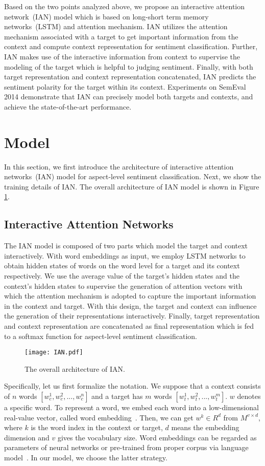 \documentclass{article}
\begin{document}
Based on the two points analyzed above,  we propose an interactive attention network~(IAN) model which is based on long-short term memory networks~(LSTM) and attention mechanism. 
IAN utilizes the attention mechanism associated with a target to get important information from the context and  compute context representation for sentiment classification.
Further, IAN makes use of the interactive information from context to supervise the modeling of the target which is helpful to judging sentiment. 
Finally, with both target representation and context representation concatenated, IAN predicts the sentiment polarity for the target within its context.
Experiments on SemEval 2014 demonstrate that  IAN can precisely model both targets and contexts, and achieve the state-of-the-art performance.

\section{Model}
In this section, we first introduce the architecture of interactive attention networks~(IAN) model for aspect-level sentiment classification.
Next, we show the training details of IAN.
The overall architecture of IAN model is shown in Figure \ref{fig:IAN}.
\subsection{Interactive Attention Networks}
The IAN model is composed of two parts which model the target and context interactively. 
With word embeddings as input, we employ LSTM networks to obtain hidden states of words on the word level for a target and its context respectively.
We use the average value of the target's hidden states and the context's hidden states to supervise the generation of attention vectors with which the attention mechanism is adopted to capture the important information in the context and target. With this design, the target and context can influence the generation of their representations interactively.
Finally, target representation and context representation are concatenated as final representation which is fed to a softmax function for aspect-level sentiment classification.
\begin{figure}[htb]
\centering
\texttt{[image: IAN.pdf]}
\caption{The overall architecture of IAN.}
\label{fig:IAN}
\end{figure}

Specifically, let us first formalize the notation. We suppose that a context consists of $n$ words $[w_c^1, w_c^2, ..., w_c^n]$ and a target has  $m$ words $[w_t^1, w_t^2, ..., w_t^m]$. $w$ denotes a specific word.
To represent a word, we embed each word into a low-dimensional  real-value vector, called word embedding~\cite{bengio2003neural}.
Then, we can get  $w^k \in R^d$ from $M^{v\times d}$, where $k$ is the word index in the context or target, $d$ means the embedding dimension and $v$ gives the vocabulary size.  
Word embeddings can be regarded as parameters of neural networks or pre-trained from proper corpus via language model~\cite{collobert2008unified,mikolov2010recurrent,huang2012improving,pennington2014glove}. In our model, we choose the latter strategy.
 
\end{document}
